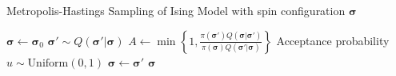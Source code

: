 \documentclass{article}
\begin{document}
\begin{algorithm}
    \caption{Metropolis-Hastings Sampling of Ising Model with spin configuration $\boldsymbol{\sigma}$}
\begin{algorithmic}[1]
    \State $\boldsymbol\sigma \gets \boldsymbol\sigma_0$
    \State $\boldsymbol\sigma' \sim Q(\boldsymbol\sigma'|\boldsymbol\sigma)$
    \State $A\gets \min\left\{1, \frac{\pi(\boldsymbol\sigma')Q(\boldsymbol\sigma|\boldsymbol\sigma')}{\pi(\boldsymbol\sigma)Q(\boldsymbol\sigma'|\boldsymbol\sigma)}\right\}$ \Comment Acceptance probability
    \State $u \sim \mathrm{Uniform}(0,1)$
    \State $\boldsymbol\sigma \gets \boldsymbol\sigma'$
    \EndIf
    \EndFor
    \State \Return $\boldsymbol\sigma$
    \EndFunction
\end{algorithmic}
\end{algorithm}
\end{document}
